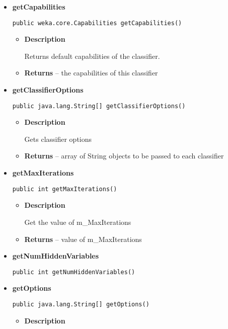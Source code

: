 \documentclass[11pt,a4paper]{report}
\begin{document}
{{{{{\begin{itemize}
{\begin{itemize}
{Method called when iteration has terminated. Imputes class values if m\_Supervised is set.
}
\end{itemize}
}%
\item{ 
{\bf  getCapabilities}\\
\begin{lstlisting}[frame=none]
public weka.core.Capabilities getCapabilities()\end{lstlisting} %
\begin{itemize}
\item{
{\bf  Description}

Returns default capabilities of the classifier.
}
\item{{\bf  Returns} -- 
the capabilities of this classifier 
}%
\end{itemize}
}%
\item{ 
{\bf  getClassifierOptions}\\
\begin{lstlisting}[frame=none]
public java.lang.String[] getClassifierOptions()\end{lstlisting} %
\begin{itemize}
\item{
{\bf  Description}

Gets classifier options
}
\item{{\bf  Returns} -- 
array of String objects to be passed to each classifier 
}%
\end{itemize}
}%
\item{ 
{\bf  getMaxIterations}\\
\begin{lstlisting}[frame=none]
public int getMaxIterations()\end{lstlisting} %
\begin{itemize}
\item{
{\bf  Description}

Get the value of m\_MaxIterations
}
\item{{\bf  Returns} -- 
value of m\_MaxIterations 
}%
\end{itemize}
}%
\item{ 
{\bf  getNumHiddenVariables}\\
\begin{lstlisting}[frame=none]
public int getNumHiddenVariables()\end{lstlisting} %
}%
\item{ 
{\bf  getOptions}\\
\begin{lstlisting}[frame=none]
public java.lang.String[] getOptions()\end{lstlisting} %
\begin{itemize}
\item{
{\bf  Description}

}
\end{itemize}}
\end{itemize}}}}}}
\end{document}
